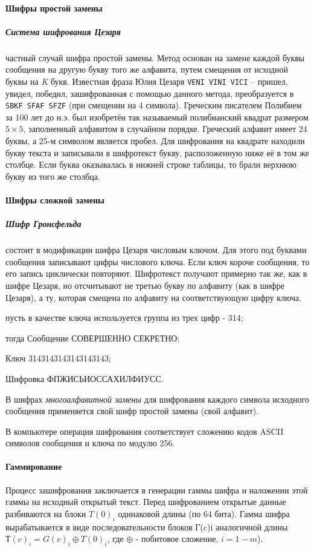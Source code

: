 \paragraph{Шифры простой замены}

\subparagraph{Система шифрования Цезаря} частный случай шифра простой замены.
Метод основан на замене каждой буквы сообщения на другую букву того же
алфавита, путем смещения от исходной буквы на \emph{K} букв. Известная фраза
Юлия Цезаря \texttt{VENI VINI VICI} – пришел, увидел, победил, зашифрованная
с помощью данного метода, преобразуется в \texttt{SBKF SFAF SFZF} (при
смещении на 4 символа). Греческим писателем Полибием за 100 лет до н.э. был
изобретён так называемый полибианский квадрат размером $5\times 5$,
заполненный алфавитом в случайном порядке. Греческий алфавит имеет 24 буквы,
а 25-м символом является пробел. Для шифрования на квадрате находили букву
текста и записывали в шифротекст букву, расположенную ниже её в том же
столбце. Если буква оказывалась в нижней строке таблицы, то брали верхнюю
букву из того же столбца.

\paragraph{Шифры сложной замены}

\subparagraph{Шифр Гронсфельда} состоит в модификации шифра Цезаря числовым
ключом. Для этого под буквами сообщения записывают цифры числового ключа.
Если ключ короче сообщения, то его запись циклически повторяют. Шифротекст
получают примерно так же, как в шифре Цезаря, но отсчитывают не третью букву
по алфавиту (как в шифре Цезаря), а ту, которая смещена по алфавиту на
соответствующую цифру ключа.
\begin{Notes}
  \item пусть в качестве ключа используется группа из трех цифр - 314;
  \item тогда Сообщение СОВЕРШЕННО СЕКРЕТНО;
  \item Ключ 3143143143143143143;
  \item Шифровка ФПЖИСЬИОССАХИЛФИУСС.
\end{Notes}
В шифрах \emph{многоалфавитной замены} для шифрования каждого символа
исходного сообщения применяется свой шифр простой замены (свой алфавит).

В компьютере операция шифрования соответствует сложению кодов ASCII символов
сообщения и ключа по модулю 256.

\paragraph{Гаммирование}
Процесс зашифрования заключается в генерации гаммы шифра и наложении этой
гаммы на исходный открытый текст. Перед шифрованием открытые данные
разбиваются на блоки $T(0)_i$ одинаковой длины (по 64 бита). Гамма шифра
вырабатывается в виде последовательности блоков Г(c)i аналогичной длины
$Т(c)_i=G(c)_i \oplus T(0)_i$, где $\oplus $ - побитовое сложение, $i =1-m$).


